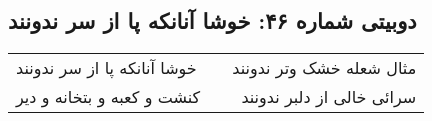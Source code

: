 \begin{center}
\section*{دوبیتی شماره ۴۶: خوشا آنانکه پا از سر ندونند}
\label{sec:046}
\begin{longtable}{l p{0.5cm} r}
خوشا آنانکه پا از سر ندونند
&&
مثال شعله خشک وتر ندونند
\\
کنشت و کعبه و بتخانه و دیر
&&
سرائی خالی از دلبر ندونند
\\
\end{longtable}
\end{center}
